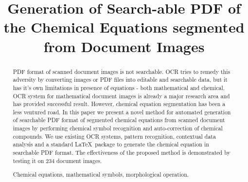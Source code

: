 \documentclass[conference]{IEEEtran}
\begin{document}
\title{Generation of Search-able PDF of the Chemical Equations segmented from Document Images}



\author{
\and
{}
}


\maketitle


\begin{abstract}
 PDF format of scanned document images is not searchable. OCR tries to remedy this adversity by converting images or PDF files into
editable and searchable data, but it has it’s own limitations in presence of equations - both mathematical and chemical. OCR system for mathematical document images is already a major research area and has provided successful result. However,
chemical equation segmentation has been a less ventured road. In this paper we present a novel method for automated generation of searchable PDF format of segmented chemical equations from scanned document images by performing chemical symbol recognition and auto-correction of chemical compounds. We use existing OCR systems, pattern recognition, contextual data
analysis and a standard \LaTeX\ package to generate the chemical equation in searchable PDF format. The effectiveness of the
proposed method is demonstrated by testing it on 234 document images. 

\keywords Chemical equations, mathematical symbols, morphological operation. 
\end{abstract}
\end{document}
